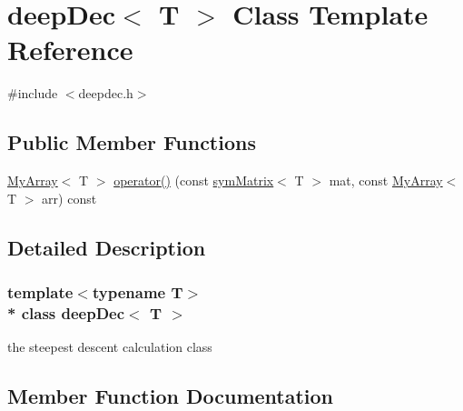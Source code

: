 \hypertarget{classdeepDec}{}\section{deep\+Dec$<$ T $>$ Class Template Reference}
\label{classdeepDec}


{\ttfamily \#include $<$deepdec.\+h$>$}

\subsection*{Public Member Functions}
\begin{DoxyCompactItemize}
\item 
\hyperlink{classMyArray}{My\+Array}$<$ T $>$ \hyperlink{classdeepDec_a4984e6083a3b5ab7eb22e0576d6d4b8b}{operator()} (const \hyperlink{classsymMatrix}{sym\+Matrix}$<$ T $>$ mat, const \hyperlink{classMyArray}{My\+Array}$<$ T $>$ arr) const 
\end{DoxyCompactItemize}


\subsection{Detailed Description}
\subsubsection*{template$<$typename T$>$\\*
class deep\+Dec$<$ T $>$}

the steepest descent calculation class 

\subsection{Member Function Documentation}
